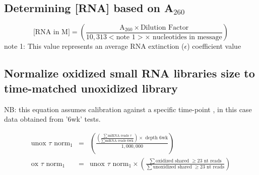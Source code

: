 \ \\
\ \\

\subsection{Determining [RNA] based on A$_{260}$}


$$
\mbox{[RNA in M]} = \left( \frac{\mbox{A}_{260} \times \mbox{Dilution Factor}}
                           {10,313 < \mbox{note 1}> \times \mbox{ nucleotides in message}} \right) 
$$
note 1: This value represents an average RNA extinction ($\epsilon$) coefficient value \\

\subsection{Normalize oxidized small RNA libraries size to time-matched unoxidized library}

NB: this equation assumes calibration against a specific time-point ,
in this case data obtained from '6wk' tests.

\begin{eqnarray*}
     \mbox{unox }\tau \mbox{ norm}_1 & = & \left(         
                        \frac{\left( \frac{\displaystyle\sum \mbox{miRNA reads } \tau}{\displaystyle \sum \mbox{miRNA reads 6wk} } \right) \times \mbox{ depth 6wk} }{1,000,000}              
                                          \right)\\
\mbox{ox }\tau \mbox{ norm}_1 & = &   \mbox{unox }\tau \mbox{ norm}_1 \times
                                 \left(
                                  \frac{\displaystyle \sum \mbox{oxidized shared } \ge \mbox{23 nt reads}}{\displaystyle \sum \mbox{unoxidized shared } \ge \mbox{23 nt reads}}
                                 \right)                                         
\end{eqnarray*}

